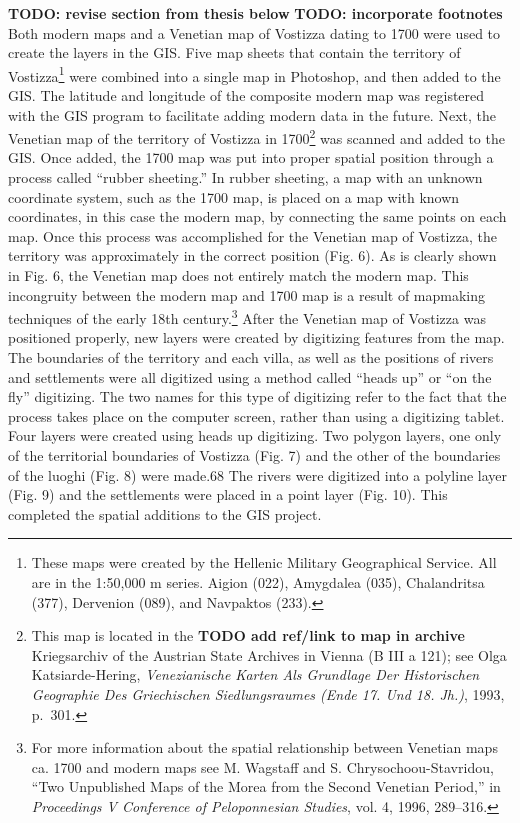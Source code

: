 \documentclass[english,]{book}
\begin{document}
\textbf{TODO: revise section from thesis below}
\textbf{TODO: incorporate footnotes}
Both modern maps and a Venetian map of Vostizza dating to 1700 were used to create the layers in the GIS. Five map sheets that contain the territory of Vostizza\footnote{These maps were created by the Hellenic Military Geographical Service. All are in the 1:50,000 m series. Aigion (022), Amygdalea (035), Chalandritsa (377), Dervenion (089), and Navpaktos (233).} were combined into a single map in Photoshop, and then added to the GIS. The latitude and longitude of the composite modern map was registered with the GIS program to facilitate adding modern data in the future.
Next, the Venetian map of the territory of Vostizza in 1700\footnote{This map is located in the \textbf{TODO add ref/link to map in archive} Kriegsarchiv of the Austrian State Archives in Vienna (B III a 121); see Olga Katsiarde-Hering, \emph{Venezianische Karten Als Grundlage Der Historischen Geographie Des Griechischen Siedlungsraumes (Ende 17. Und 18. Jh.)}, 1993, p.~301.} was scanned and added to the GIS. Once added, the 1700 map was put into proper spatial position through a process called ``rubber sheeting.'' In rubber sheeting, a map with an unknown coordinate system, such as the 1700 map, is placed on a map with known coordinates, in this case the modern map, by connecting the same points on each map. Once this process was accomplished for the Venetian map of Vostizza, the territory was approximately in the correct position (Fig. 6). As is clearly shown in Fig. 6, the Venetian map does not entirely match the modern map. This incongruity between the modern map and 1700 map is a result of mapmaking techniques of the early 18th century.\footnote{For more information about the spatial relationship between Venetian maps ca. 1700 and modern maps see M. Wagstaff and S. Chrysochoou-Stavridou, ``Two Unpublished Maps of the Morea from the Second Venetian Period,'' in \emph{Proceedings V Conference of Peloponnesian Studies}, vol. 4, 1996, 289--316.}
After the Venetian map of Vostizza was positioned properly, new layers were created by digitizing features from the map. The boundaries of the territory and each villa, as well as the positions of rivers and settlements were all digitized using a method called ``heads up'' or ``on the fly'' digitizing. The two names for this type of digitizing refer to the fact that the process takes place on the computer screen, rather than using a digitizing tablet. Four layers were created using heads up digitizing. Two polygon layers, one only of the territorial boundaries of Vostizza (Fig. 7) and the other of the boundaries of the luoghi (Fig. 8) were made.68 The rivers were digitized into a polyline layer (Fig. 9) and the settlements were placed in a point layer (Fig. 10). This completed the spatial additions to the GIS project.
\end{document}
